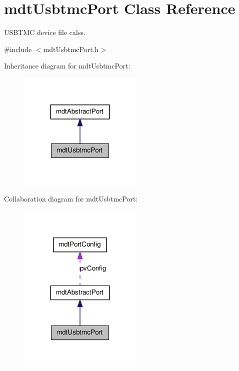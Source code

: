 \hypertarget{classmdt_usbtmc_port}{
\section{mdtUsbtmcPort Class Reference}
\label{classmdt_usbtmc_port}
}


USBTMC device file calss.  




{\ttfamily \#include $<$mdtUsbtmcPort.h$>$}



Inheritance diagram for mdtUsbtmcPort:\nopagebreak
\begin{figure}[H]
\begin{center}
\leavevmode
\includegraphics[width=168pt]{classmdt_usbtmc_port__inherit__graph}
\end{center}
\end{figure}


Collaboration diagram for mdtUsbtmcPort:\nopagebreak
\begin{figure}[H]
\begin{center}
\leavevmode
\includegraphics[width=168pt]{classmdt_usbtmc_port__coll__graph}
\end{center}
\end{figure}
